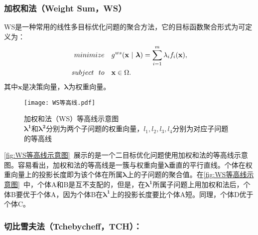 \subsubsection{加权和法（Weight Sum，WS）}

WS是一种常用的线性多目标优化问题的聚合方法\cite{hillermeier2001nonlinear}，它的目标函数聚合形式为可定义为：
\begin{align}
    \label{eq:WS}
    minimize \quad & g^{ws}(\mathbf{x} \ | \ \boldsymbol{\lambda}) = \sum_{i=1}^m \lambda_i f_i(\mathbf{x}), \\
    subject \ \ to \quad & \mathbf{x} \in \Omega. \notag
\end{align}
其中$\mathbf{x}$是决策向量，$\boldsymbol{\lambda}$为权重向量。
\begin{figure}[htb]
    \texttt{[image: WS等高线.pdf]}
    \caption[加权和法（WS）等高线示意图]{加权和法（WS）等高线示意图 \\ $\boldsymbol{\lambda^1}$和$\boldsymbol{\lambda^2}$分别为两个子问题的权重向量，$l_1, l_2, l_3, l_4$分别为对应子问题的等高线}
    \label{fig:WS等高线示意图}
\end{figure}
\par
\autoref{fig:WS等高线示意图}~展示的是一个二目标优化问题使用加权和法的等高线示意图。容易看出，加权和法的等高线是一簇与权重向量$\boldsymbol{\lambda}$垂直的平行直线。个体在权重向量上的投影长度即为该个体在所属$\boldsymbol{\lambda}$上的子问题的聚合值。在\autoref{fig:WS等高线示意图}~中，个体A和B是互不支配的，但是，在$\boldsymbol{\lambda^1}$所属子问题上用加权和法后，个体B要优于个体A，因为个体B在$\boldsymbol{\lambda^1}$上的投影长度要比个体A短。同理，个体D优于个体C。

\subsubsection{切比雪夫法（Tchebycheff，TCH）：}

